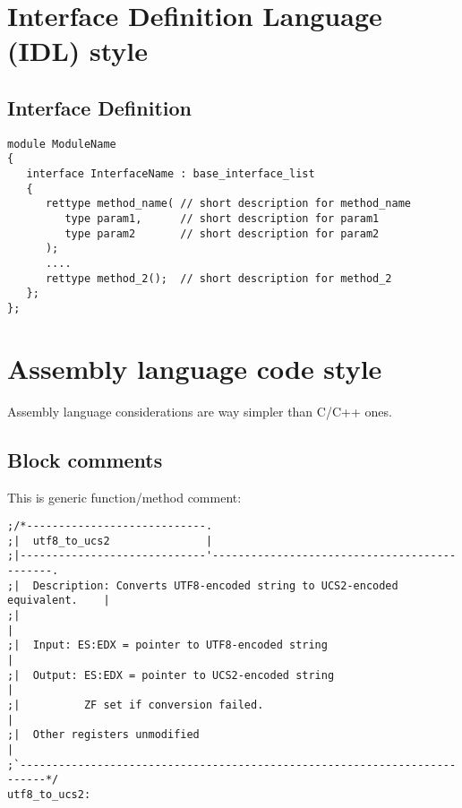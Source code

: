 \documentclass[onecolumn]{article}
\begin{document}
\section{Interface Definition Language (IDL) style}


\subsection{Interface Definition}

\small
\begin{verbatim}
module ModuleName
{
   interface InterfaceName : base_interface_list
   {
      rettype method_name( // short description for method_name
         type param1,      // short description for param1
         type param2       // short description for param2
      );
      ....
      rettype method_2();  // short description for method_2
   };
};
\end{verbatim}
\normalsize



\section{Assembly language code style}

\par Assembly language considerations are way simpler than C/C++ ones.


\subsection{Block comments}

\par This is generic function/method comment:

\small
\begin{verbatim}
;/*----------------------------.
;|  utf8_to_ucs2               |
;|-----------------------------'---------------------------------------------.
;|  Description: Converts UTF8-encoded string to UCS2-encoded equivalent.    |
;|                                                                           |
;|  Input: ES:EDX = pointer to UTF8-encoded string                           |
;|  Output: ES:EDX = pointer to UCS2-encoded string                          |
;|          ZF set if conversion failed.                                     |
;|  Other registers unmodified                                               |
;`--------------------------------------------------------------------------*/
utf8_to_ucs2:
\end{verbatim}
\normalsize
\end{document}
